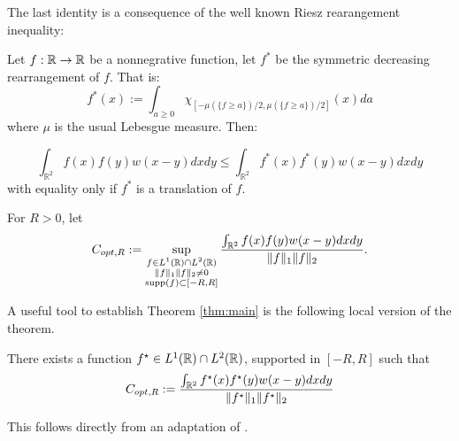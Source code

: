 The last identity is a consequence of the well known Riesz rearangement inequality:


	\begin{lemma}
		Let $f:{\mathbb R}\to{\mathbb R}$ be a nonnegrative function, let $f^*$ be the symmetric decreasing rearrangement of $f$. That is:
		$$f^*(x) := \int_{a\ge 0} \chi_{[-\mu(\{f\ge a\})/2, \mu(\{f\ge a\})/2]}(x) da $$ 
		where $\mu$ is the usual Lebesgue measure. Then:

		\begin{equation}
			\int_{\mathbb R^2} f(x)f(y) w(x-y) dx dy \le 
			\int_{\mathbb R^2} f^*(x)f^*(y) w(x-y) dx dy
		\end{equation}
		with equality only if $f^*$ is a translation of $f$.%
	\end{lemma}

For $R>0$, let 
$$
	C_{opt,R}:=\sup_{\substack{f\in L^{1}({\mathbb R})\cap L^{2}({\mathbb R})\\ \|f\|_1\|f\|_2\neq0\\ \operatorname{supp}(f)\subset [-R,R]}}
				\frac{\int_{\mathbb R^2} f(x)f(y)w(x-y) dx dy }{\|f\|_1\|f\|_2}.
$$

A useful tool to establish Theorem \ref{thm:main} is the following local version of the theorem. 
\begin{proposition}\label{restricted extremizers existence}
There exists a function $f^\star\in L^{1}({\mathbb R})\cap L^{2}({\mathbb R})$, supported in $[-R,R]$ such that
$$
C_{opt,R}:=\frac{\int_{\mathbb R^2} f^\star(x)f^\star(y)w(x-y) dx dy }{\|f^\star\|_1\|f^\star\|_2}
$$
\end{proposition}
This follows directly from an adaptation of \cite[Theorem 1.6]{MR}.



